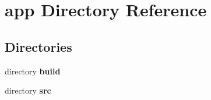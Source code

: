 \section{app Directory Reference}
\label{dir_e382fe0887b6036604c880a43422bbcd}
\subsection*{Directories}
\begin{DoxyCompactItemize}
\item 
directory {\bf build}
\item 
directory {\bf src}
\end{DoxyCompactItemize}
